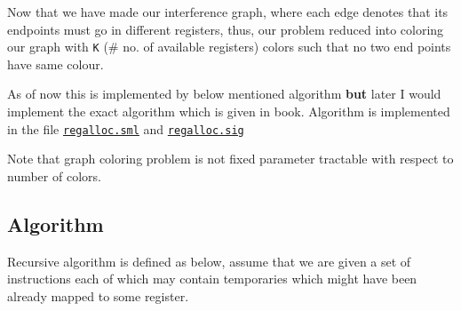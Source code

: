 
Now that we have made our interference graph, where each edge denotes
that its endpoints must go in different registers, thus, our problem
reduced into coloring our graph with
\texttt{K} (\#
no. of available registers) colors such that no two end points have same
colour.

As of now this is implemented by below mentioned algorithm \textbf{but}
later I would implement the exact algorithm which is given in book.
Algorithm is implemented in the file
\href{https://www.github.com/sourabh2311/btp/tree/master/Compiler/regalloc.sml}{\texttt{regalloc.sml}}
and
\href{https://www.github.com/sourabh2311/btp/tree/master/Compiler/regalloc.sig}{\texttt{regalloc.sig}}

Note that graph coloring problem is not fixed parameter tractable with
respect to number of colors.

\hypertarget{algorithm}{%
\subsection{Algorithm}\label{algorithm}}

Recursive algorithm is defined as below, assume that we are given a set
of instructions each of which may contain temporaries which might have
been already mapped to some register.

